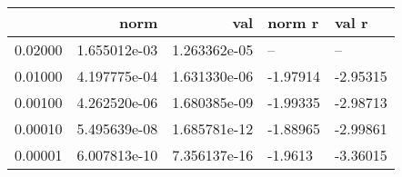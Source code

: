 \begin{tabular}{lrrll}
\toprule
{} &          norm &           val &   norm r &    val r \\
\midrule
0.02000 &  1.655012e-03 &  1.263362e-05 &       -- &       -- \\
0.01000 &  4.197775e-04 &  1.631330e-06 & -1.97914 & -2.95315 \\
0.00100 &  4.262520e-06 &  1.680385e-09 & -1.99335 & -2.98713 \\
0.00010 &  5.495639e-08 &  1.685781e-12 & -1.88965 & -2.99861 \\
0.00001 &  6.007813e-10 &  7.356137e-16 &  -1.9613 & -3.36015 \\
\bottomrule
\end{tabular}
